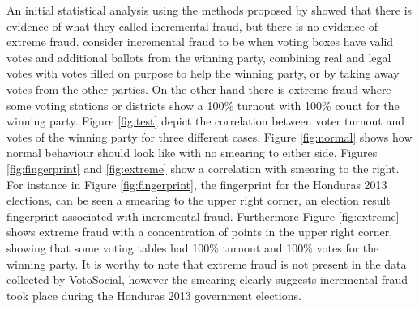 \documentclass[letterpaper,10pt]{article}
\begin{document}
An initial statistical analysis using the methods proposed by \cite{klimek2012} showed that there is evidence of what they called incremental fraud, but there is no evidence of extreme fraud. \citep{klimek2012} consider incremental fraud to be when voting boxes have valid votes and additional ballots from the winning party, combining real and legal votes with votes filled on purpose to help the winning party, or by taking away votes from the other parties. On the other hand there is extreme fraud where some voting stations or districts show a 100\% turnout with 100\% count for the winning party. Figure \ref{fig:test} depict the correlation between voter turnout and votes of the winning party for three different cases. Figure \ref{fig:normal} shows how normal behaviour should look like with no smearing to either side. Figures \ref{fig:fingerprint} and \ref{fig:extreme} show a correlation with smearing to the right. For instance in Figure \ref{fig:fingerprint}, the fingerprint for the Honduras 2013 elections, can be seen a smearing to the upper right corner, an election result fingerprint associated with incremental fraud. Furthermore Figure \ref{fig:extreme} shows extreme fraud with a concentration of points in the upper right corner, showing that some voting tables had 100\% turnout and 100\% votes for the winning party. It is worthy to note that extreme fraud is not present in the data collected by VotoSocial, however the smearing clearly suggests incremental fraud took place during the Honduras 2013 government elections.

\end{document}
